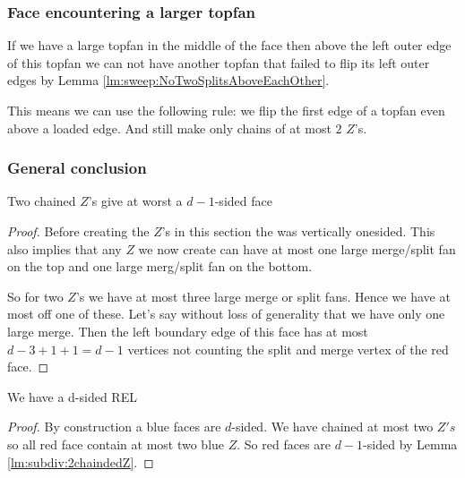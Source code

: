 \subsubsection{Face encountering a larger topfan}
If we have a large topfan in the middle of the face then above the left outer edge of this topfan we can not have another topfan that failed to flip its left outer edges by Lemma \ref{lm:sweep:NoTwoSplitsAboveEachOther}.

This means we can use the following rule: we flip the first edge of a topfan even above a loaded edge. And still make only chains of at most $2$ $Z$'s.


\subsubsection{General conclusion}
\begin{lemma}
  \label{lm:subdiv:2chaindedZ}
  Two chained $Z$'s give at worst a $d-1$-sided face
\end{lemma}
\begin{proof}
  Before creating the $Z$'s in this section the \rel was vertically onesided. This also implies that  any $Z$ we now create can have at most one large merge/split fan on the top and one large merg/split fan on the bottom.

  So for two $Z$'s we have at most three large merge or split fans. Hence we have at most off one of these. Let's say without loss of generality that we have only one large merge. Then the left boundary edge of this face has at most $d-3 + 1 +1 =d-1$ vertices not counting the split and merge vertex of the red face.
\end{proof}

\begin{thrm}
  \label{th:final}
  We have a d-sided REL
\end{thrm}

\begin{proof}
  By construction a blue faces are $d$-sided. We have chained at most two $Z's$ so all red face contain at most two blue $Z$. So red faces are $d-1$-sided by Lemma \ref{lm:subdiv:2chaindedZ}.
\end{proof}
